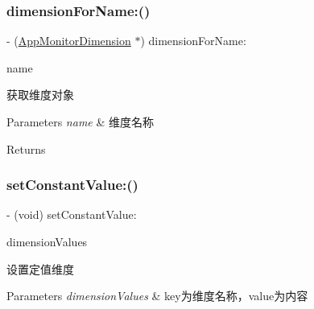 \subsubsection{\texorpdfstring{dimension\+For\+Name\+:()}{dimensionForName:()}}
{\footnotesize\ttfamily -\/ (\mbox{\hyperlink{interface_app_monitor_dimension}{App\+Monitor\+Dimension}} $\ast$) dimension\+For\+Name\+: \begin{DoxyParamCaption}\item[{(N\+S\+String $\ast$)}]{name }\end{DoxyParamCaption}}

获取维度对象


\begin{DoxyParams}{Parameters}
{\em name} & 维度名称 \\
\hline
\end{DoxyParams}
\begin{DoxyReturn}{Returns}

\end{DoxyReturn}
\mbox{\label{interface_app_monitor_dimension_set_abdb8fb0d024ceb92c0a386317702a04e}} 
\subsubsection{\texorpdfstring{set\+Constant\+Value\+:()}{setConstantValue:()}}
{\footnotesize\ttfamily -\/ (void) set\+Constant\+Value\+: \begin{DoxyParamCaption}\item[{(\mbox{\hyperlink{interface_app_monitor_dimension_value_set}{App\+Monitor\+Dimension\+Value\+Set}} $\ast$)}]{dimension\+Values }\end{DoxyParamCaption}}

设置定值维度


\begin{DoxyParams}{Parameters}
{\em dimension\+Values} & key为维度名称，value为内容 \\
\hline
\end{DoxyParams}
\mbox{\label{interface_app_monitor_dimension_set_a7857e701c8f458842a22fe4450a4e8ee}} 
